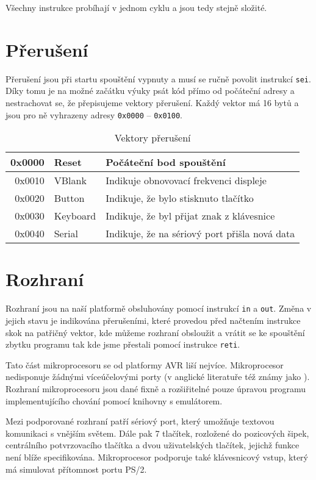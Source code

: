 Všechny instrukce probíhají v jednom cyklu a jsou tedy stejně složité.

\section{Přerušení}

Přerušení jsou při startu spouštění vypnuty a musí se ručně povolit instrukcí \texttt{sei}. Díky tomu je na možné začátku výuky psát kód přímo od počáteční adresy a nestrachovat se, že přepisujeme vektory přerušení. Každý vektor má 16 bytů a jsou pro ně vyhrazeny adresy \texttt{0x0000} -- \texttt{0x0100}. 

\begin{table}[htbp]
\begin{center}
\begin{tabular}{| r | l | l |}
\hline
0x0000 & Reset    & Počáteční bod spouštění \\ \hline
0x0010 & VBlank	  & Indikuje obnovovací frekvenci displeje \\ \hline
0x0020 & Button   & Indikuje, že bylo stisknuto tlačítko \\ \hline
0x0030 & Keyboard & Indikuje, že byl přijat znak z klávesnice \\ \hline
0x0040 & Serial   & Indikuje, že na sériový port přišla nová data \\
\hline
\end{tabular}
\end{center}
\caption{Vektory přerušení}
\label{tbl:vector-positions}
\end{table}

\section{Rozhraní}

Rozhraní jsou na naší platformě obsluhovány pomocí instrukcí \texttt{in} a \texttt{out}. Změna v jejich stavu je indikována přerušeními, které provedou před načtením instrukce skok na patřičný vektor, kde můžeme rozhraní obsloužit a vrátit se ke spouštění zbytku programu tak kde jsme přestali pomocí instrukce \texttt{reti}.

Tato část mikroprocesoru se od platformy AVR liší nejvíce. Mikroprocesor nedisponuje žádnými víceúčelovými porty (v anglické literatuře též známy jako ). Rozhraní mikroprocesoru jsou dané fixně a rozšiřitelné pouze úpravou programu implementujícího chování pomocí knihovny s emulátorem.

Mezi podporované rozhraní patří sériový port, který umožňuje textovou komunikaci s vnějším světem. Dále pak 7 tlačítek, rozložené do pozicových šipek, centrálního potvrzovacího tlačítka a dvou uživatelských tlačítek, jejichž funkce není blíže specifikována. Mikroprocesor podporuje také klávesnicový vstup, který má simulovat přítomnost portu PS/2.

